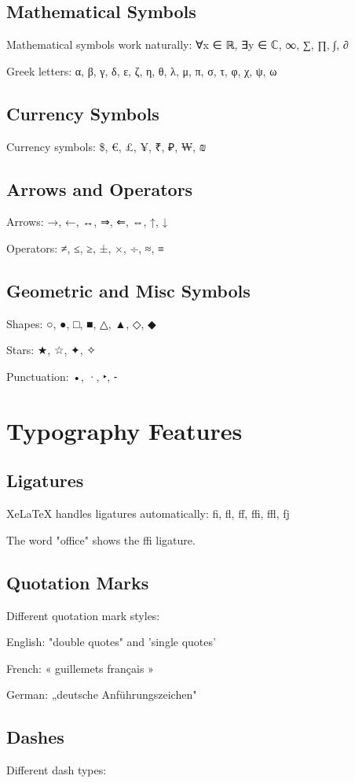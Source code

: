 \documentclass[12pt,a4paper]{article}
\begin{document}
\subsection{Mathematical Symbols}
Mathematical symbols work naturally: ∀x ∈ ℝ, ∃y ∈ ℂ, ∞, ∑, ∏, ∫, ∂

Greek letters: α, β, γ, δ, ε, ζ, η, θ, λ, μ, π, σ, τ, φ, χ, ψ, ω

\subsection{Currency Symbols}
Currency symbols: \$, €, £, ¥, ₹, ₽, ₩, ₪

\subsection{Arrows and Operators}
Arrows: →, ←, ↔, ⇒, ⇐, ⇔, ↑, ↓

Operators: ≠, ≤, ≥, ±, ×, ÷, ≈, ≡

\subsection{Geometric and Misc Symbols}
Shapes: ○, ●, □, ■, △, ▲, ◇, ◆

Stars: ★, ☆, ✦, ✧

Punctuation: •, ·, ‣, ⁃

\section{Typography Features}

\subsection{Ligatures}
XeLaTeX handles ligatures automatically: fi, fl, ff, ffi, ffl, fj

The word "office" shows the ffi ligature.

\subsection{Quotation Marks}
Different quotation mark styles:

English: "double quotes" and 'single quotes'

French: « guillemets français »

German: „deutsche Anführungszeichen"

\subsection{Dashes}
Different dash types:
\end{document}

